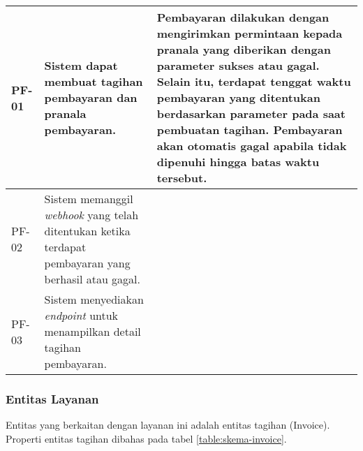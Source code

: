 \begin{longtable}{|l|p{}|p{}|}
    \hline
    \endlastfoot

    \hline
    PF-01       & Sistem dapat membuat tagihan pembayaran dan pranala pembayaran.                                              & Pembayaran dilakukan dengan mengirimkan permintaan kepada pranala yang diberikan dengan parameter sukses atau gagal. Selain itu, terdapat tenggat waktu pembayaran yang ditentukan berdasarkan parameter pada saat pembuatan tagihan. Pembayaran akan otomatis gagal apabila tidak dipenuhi hingga batas waktu tersebut. \\
    \hline
    PF-02       & Sistem memanggil \textit{webhook} yang telah ditentukan ketika terdapat pembayaran yang berhasil atau gagal. &                                                                                                                                                                                                                                                                                                                          \\
    \hline
    PF-03       & Sistem menyediakan \textit{endpoint} untuk menampilkan detail tagihan pembayaran.                            &                                                                                                                                                                                                                                                                                                                          \\
\end{longtable}
\endgroup

\subsubsection{Entitas Layanan}

Entitas yang berkaitan dengan layanan ini adalah entitas tagihan (Invoice). Properti entitas tagihan dibahas pada tabel \ref{table:skema-invoice}.

\pagebreak

